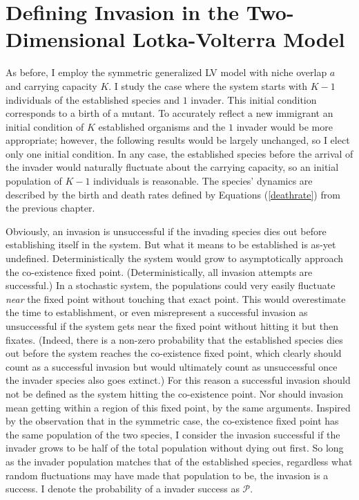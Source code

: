 \section{Defining Invasion in the Two-Dimensional Lotka-Volterra Model}

As before, I employ the symmetric generalized LV model with niche overlap $a$ and carrying capacity $K$. 
I study the case where the system starts with $K-1$ individuals of the established species and $1$ invader. 
This initial condition corresponds to a birth of a mutant. 
To accurately reflect a new immigrant an initial condition of $K$ established organisms and the $1$ invader would be more appropriate; however, the following results would be largely unchanged, so I elect only one initial condition. 
In any case, the established species before the arrival of the invader would naturally fluctuate about the carrying capacity, so an initial population of $K-1$ individuals is reasonable. 
The species' dynamics are described by the birth and death rates defined by Equations (\ref{deathrate}) from the previous chapter. 

Obviously, an invasion is unsuccessful if the invading species dies out before establishing itself in the system. 
But what it means to be established is as-yet undefined. 
Deterministically the system would grow to asymptotically approach the co-existence fixed point. 
(Deterministically, all invasion attempts are successful.) 
In a stochastic system, the populations could very easily fluctuate \emph{near} the fixed point without touching that exact point. This would overestimate the time to establishment, or even misrepresent a successful invasion as unsuccessful if the system gets near the fixed point without hitting it but then fixates. 
(Indeed, there is a non-zero probability that the established species dies out before the system reaches the co-existence fixed point, which clearly should count as a successful invasion but would ultimately count as unsuccessful once the invader species also goes extinct.) 
For this reason a successful invasion should not be defined as the system hitting the co-existence point. 
Nor should invasion mean getting within a region of this fixed point, by the same arguments. 
Inspired by the observation that in the symmetric case, the co-existence fixed point has the same population of the two species, I consider the invasion successful if the invader grows to be half of the total population without dying out first. 
So long as the invader population matches that of the established species, regardless what random fluctuations may have made that population to be, the invasion is a success. 
I denote the probability of a invader success as $\mathcal{P}$. 

